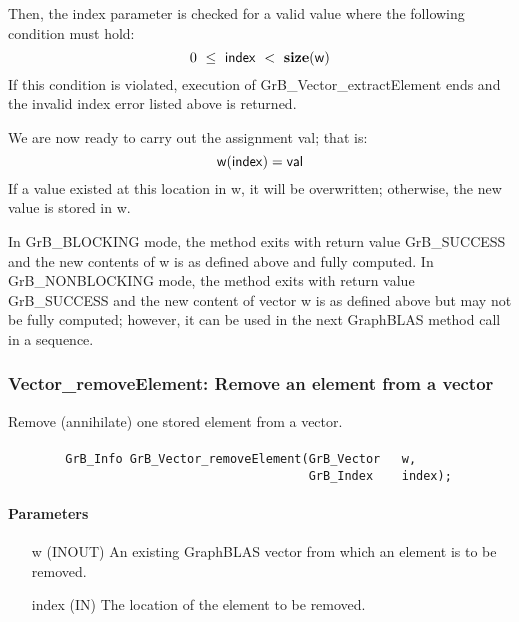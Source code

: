 Then, the {\sf index} parameter is checked for a valid value where the following
condition must hold:
\[
	0\ \leq\ {\sf index}\ <\ \mathbf{size}({\sf w})
\]
If this condition is violated, execution of {\sf GrB\_Vector\_extractElement} 
ends and the invalid index error listed above is returned.

We are now ready to carry out the assignment {\sf val}; that is:
\[
    {\sf w}({\sf index}) = {\sf val}
\]
If a value existed at this location in {\sf w}, it will be overwritten; otherwise,
the new value is stored in {\sf w}.

In {\sf GrB\_BLOCKING} mode, the method exits with return value 
{\sf GrB\_SUCCESS} and the new contents of {\sf w} is as defined above
and fully computed.  
In {\sf GrB\_NONBLOCKING} mode, the method exits with return value 
{\sf GrB\_SUCCESS} and the new content of vector {\sf w} is as defined above 
but may not be fully computed; however, it can be used in the next GraphBLAS 
method call in a sequence.


\subsubsection{{\sf Vector\_removeElement}: Remove an element from a vector}

Remove (annihilate) one stored element from a vector.

\paragraph{\syntax}

\begin{verbatim}
        GrB_Info GrB_Vector_removeElement(GrB_Vector   w,
                                          GrB_Index    index);
\end{verbatim}

\paragraph{Parameters}

\begin{itemize}[leftmargin=1.1in]
    \item[{\sf w}]   ({\sf INOUT}) An existing GraphBLAS vector from which an 
    element is to be removed.

    \item[{\sf index}] ({\sf IN}) The location of the element to be removed.
\end{itemize}

